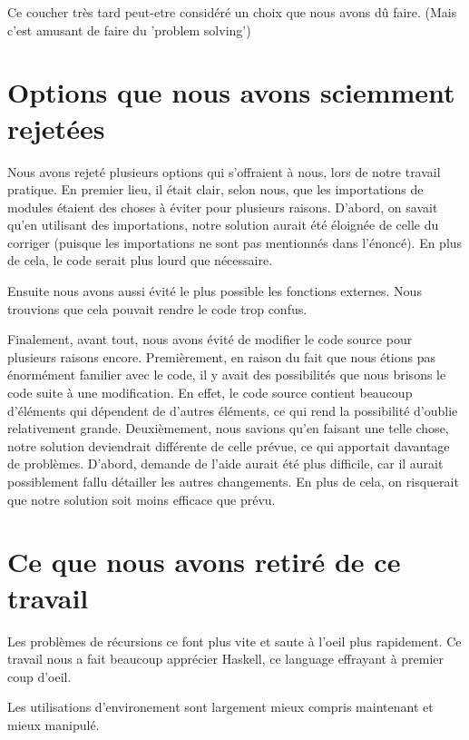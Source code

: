 \documentclass[11pt]{article}
\begin{document}
\par Ce coucher très tard peut-etre considéré un choix que nous avons dû faire. (Mais c'est amusant de faire du 'problem solving')

\section{Options que nous avons sciemment rejetées}

\par Nous avons rejeté plusieurs options qui s'offraient à nous, lors de notre travail pratique. En premier lieu, il était clair, selon nous, que les importations de modules étaient des choses à éviter pour plusieurs raisons. D'abord, on savait qu'en utilisant des importations, notre solution aurait été éloignée de celle du corriger (puisque les importations ne sont pas mentionnés dans l'énoncé). En plus de cela, le code serait plus lourd que nécessaire.

\par Ensuite nous avons aussi évité le plus possible les fonctions externes. Nous trouvions que cela pouvait rendre le code trop confus.

\par Finalement, avant tout, nous avons évité de modifier le code source pour plusieurs raisons encore. Premièrement, en raison du fait que nous étions pas énormément familier avec le code, il y avait des possibilités que nous brisons le code suite à une modification. En effet, le code source contient beaucoup d'éléments qui dépendent de d'autres éléments, ce qui rend la possibilité d'oublie relativement grande. Deuxièmement, nous savions qu'en faisant une telle chose, notre solution deviendrait différente de celle prévue, ce qui apportait davantage de problèmes. D'abord, demande de l'aide aurait été plus difficile, car il aurait possiblement fallu détailler les autres changements. En plus de cela, on risquerait que notre solution soit moins efficace que prévu.

\section{Ce que nous avons retiré de ce travail}

\par Les problèmes de récursions ce font plus vite et saute à l'oeil plus rapidement. Ce travail nous a fait beaucoup apprécier Haskell, ce language effrayant à premier coup d'oeil.

\par Les utilisations d'environement sont largement mieux compris maintenant et mieux manipulé.
\end{document}
